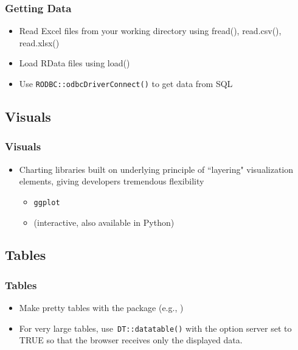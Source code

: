 \documentclass[
	11pt, %
]{beamer}
\begin{document}
\begin{frame}
	\frametitle{Getting Data}
	
	\begin{itemize}
	\item Read Excel files from your working directory using fread(), read.csv(), read.xlsx()
	\item Load RData files using load()
	\item Use \texttt{RODBC::odbcDriverConnect()} to get data from SQL
	\end{itemize}
	
\end{frame}

\subsection{Visuals}

\begin{frame}
	\frametitle{Visuals}
	
	\begin{itemize}
		\item Charting libraries built on underlying principle of ``layering" visualization elements, giving developers tremendous flexibility
		\begin{itemize}
			\item \texttt{ggplot} 
			\item \href{https://plotly.com/r/}{} (interactive, also available in Python) 
		\end{itemize}
	\end{itemize}
\end{frame}

\subsection{Tables}
\begin{frame}
	\frametitle{Tables}
	
	\begin{itemize}
	\item Make pretty tables with the \href{https://glin.github.io/reactable/}{} package (e.g., \href{https://glin.github.io/reactable/articles/womens-world-cup/womens-world-cup.html}{\color{blue}{2019 Women's World Cup Predictions}})
	\item For very large tables, use\texttt{ DT::datatable()} with the option server set to TRUE so that the browser receives only the displayed data.
	\end{itemize}
	
\end{frame}
\end{document}
